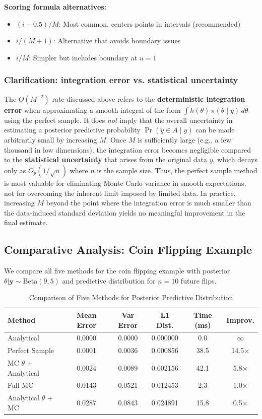 \textbf{Scoring formula alternatives:}
\begin{itemize}
\item $(i - 0.5) / M$: Most common, centers points in intervals (recommended)
\item $i / (M + 1)$: Alternative that avoids boundary issues
\item $i / M$: Simpler but includes boundary at $u=1$
\end{itemize}

\subsubsection*{Clarification: integration error vs. statistical uncertainty}
The \(O(M^{-2})\) rate discussed above refers to the \textbf{deterministic integration error} when approximating a smooth integral of the form \(\int h(\theta)\,\pi(\theta\mid y)\,d\theta\) using the perfect sample. It does \emph{not} imply that the overall uncertainty in estimating a posterior predictive probability \(\Pr(\tilde y\in A\mid y)\) can be made arbitrarily small by increasing \(M\). Once \(M\) is sufficiently large (e.g., a few thousand in low dimensions), the integration error becomes negligible compared to the \textbf{statistical uncertainty} that arises from the original data \(y\), which decays only as \(O_p(1/\sqrt{n})\) where \(n\) is the sample size. Thus, the perfect sample method is most valuable for eliminating Monte Carlo variance in smooth expectations, not for overcoming the inherent limit imposed by limited data. In practice, increasing \(M\) beyond the point where the integration error is much smaller than the data-induced standard deviation yields no meaningful improvement in the final estimate.

\subsection{Comparative Analysis: Coin Flipping Example}
We compare all five methods for the coin flipping example with posterior $\theta|\mathbf{y} \sim \text{Beta}(9,5)$ and predictive distribution for $n=10$ future flips.

\begin{table}[H]
\centering
\caption{Comparison of Five Methods for Posterior Predictive Distribution}
\begin{tabular}{lccccc}
\toprule
\textbf{Method} & \textbf{Mean Error} & \textbf{Var Error} & \textbf{L1 Dist.} & \textbf{Time (ms)} & \textbf{Improv.} \\
\midrule
Analytical & 0.0000 & 0.0000 & 0.000000 & 0.0 & $\infty$ \\
Perfect Sample & 0.0001 & 0.0036 & 0.000856 & 38.5 & 14.5× \\
MC $\theta$ + Analytical & 0.0024 & 0.0089 & 0.002156 & 42.1 & 5.8× \\
Full MC & 0.0143 & 0.0521 & 0.012453 & 2.3 & 1.0× \\
Analytical $\theta$ + MC & 0.0287 & 0.0843 & 0.024891 & 15.8 & 0.5× \\
\bottomrule
\end{tabular}
\end{table}

